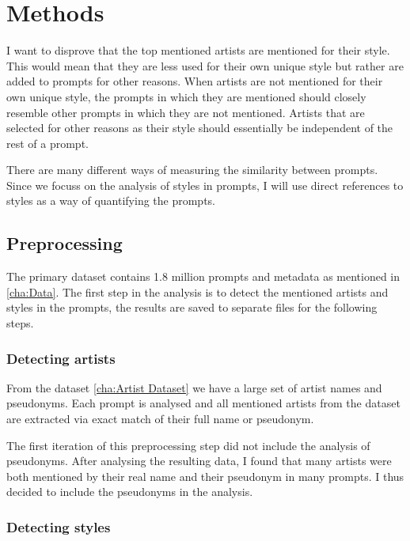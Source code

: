 \chapter{Methods}
\label{cha:Methods}

I want to disprove that the top mentioned artists are mentioned for their style. This would mean that they are less used for their own unique style but rather are added to prompts for other reasons.
When artists are not mentioned for their own unique style, the prompts in which they are mentioned should closely resemble other prompts in which they are not mentioned. Artists that are selected for other reasons as their style should essentially be independent of the rest of a prompt.

There are many different ways of measuring the similarity between prompts. Since we focuss on the analysis of styles in prompts, I will use direct references to styles as a way of quantifying the prompts. 


\section{Preprocessing}

The primary dataset contains 1.8 million prompts and metadata as mentioned in \ref{cha:Data}. The first step in the analysis is to detect the mentioned artists and styles in the prompts, the results are saved to separate files for the following steps.

\subsection{Detecting artists}


From the dataset \ref{cha:Artist Dataset} we have a large set of artist names and pseudonyms. Each prompt is analysed and all mentioned artists from the dataset are extracted via exact match of their full name or pseudonym.

The first iteration of this preprocessing step did not include the analysis of pseudonyms. After analysing the resulting data, I found that many artists were both mentioned by their real name and their pseudonym in many prompts. I thus decided to include the pseudonyms in the analysis.


\subsection{Detecting styles}


